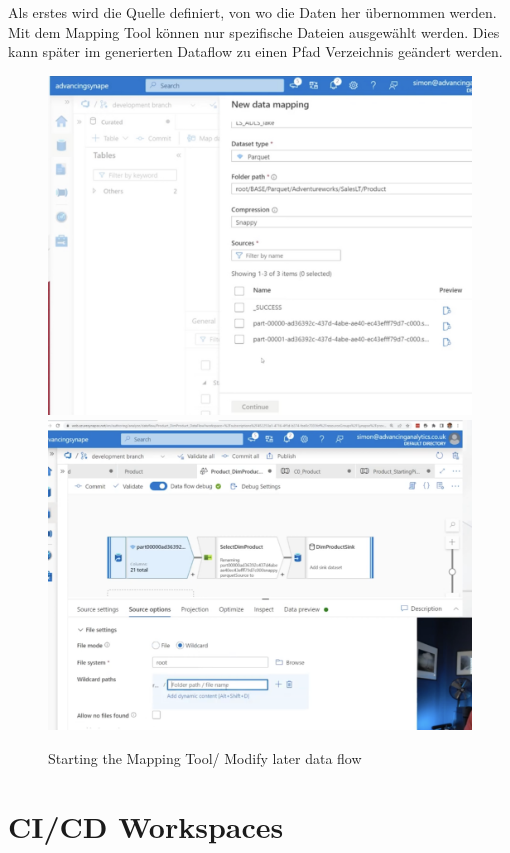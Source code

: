 Als erstes wird die Quelle definiert, von wo die Daten her übernommen werden. Mit dem Mapping Tool können nur spezifische Dateien ausgewählt werden. Dies kann später im generierten Dataflow zu einen Pfad Verzeichnis geändert werden.
\begin{figure}[H]
	\centering
	\includegraphics[scale = 0.2]{attachment/chapter_2/Scc144}
	\includegraphics[scale = 0.2]{attachment/chapter_2/Scc149}
	\caption{Starting the Mapping Tool/ Modify later data flow}
\end{figure}


\section{CI/CD Workspaces}

